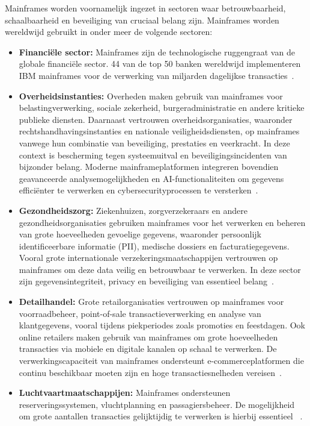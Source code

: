 Mainframes worden voornamelijk ingezet in sectoren waar betrouwbaarheid, schaalbaarheid en beveiliging van cruciaal belang zijn. Mainframes worden wereldwijd gebruikt in onder meer de volgende sectoren:

\begin{itemize}

\item \textbf{Financiële sector:} Mainframes zijn de technologische ruggengraat van de globale financiële sector. 44 van de top 50 banken wereldwijd implementeren IBM mainframes voor de verwerking van miljarden dagelijkse transacties~\autocite{ibm_case_bankwest}. 
\item \textbf{Overheidsinstanties:} Overheden maken gebruik van mainframes voor belastingverwerking, sociale zekerheid, burgeradministratie en andere kritieke publieke diensten. Daarnaast vertrouwen overheidsorganisaties, waaronder rechtshandhavingsinstanties en nationale veiligheidsdiensten, op mainframes vanwege hun combinatie van beveiliging, prestaties en veerkracht. In deze context is bescherming tegen systeemuitval en beveiligingsincidenten van bijzonder belang. Moderne mainframeplatformen integreren bovendien geavanceerde analysemogelijkheden en AI-functionaliteiten om gegevens efficiënter te verwerken en cybersecurityprocessen te versterken~\autocite{IBMMainframe}.
\item \textbf{Gezondheidszorg:} Ziekenhuizen, zorgverzekeraars en andere gezondheidsorganisaties gebruiken mainframes voor het verwerken en beheren van grote hoeveelheden gevoelige gegevens, waaronder persoonlijk identificeerbare informatie (PII), medische dossiers en facturatiegegevens. Vooral grote internationale verzekeringsmaatschappijen vertrouwen op mainframes om deze data veilig en betrouwbaar te verwerken. In deze sector zijn gegevensintegriteit, privacy en beveiliging van essentieel belang~\autocite{IBMMainframe}.
\item \textbf{Detailhandel:} Grote retailorganisaties vertrouwen op mainframes voor voorraadbeheer, point-of-sale transactieverwerking en analyse van klantgegevens, vooral tijdens piekperiodes zoals promoties en feestdagen. Ook online retailers maken gebruik van mainframes om grote hoeveelheden transacties via mobiele en digitale kanalen op schaal te verwerken. De verwerkingscapaciteit van mainframes ondersteunt e-commerceplatformen die continu beschikbaar moeten zijn en hoge transactiesnelheden vereisen~\autocite{IBMMainframe}.
\item \textbf{Luchtvaartmaatschappijen:} Mainframes ondersteunen reserveringssystemen, vluchtplanning en passagiersbeheer. De mogelijkheid om grote aantallen transacties gelijktijdig te verwerken is hierbij essentieel ~\autocite{IBMMainframe}.

\end{itemize}
